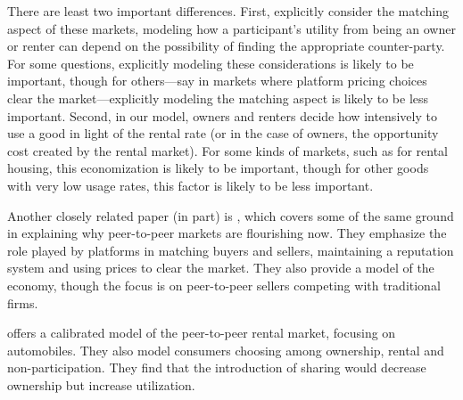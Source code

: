 \documentclass[11pt]{article}
\begin{document}
There are least two important differences.
First, \citeauthor{benjaafar2015peer} explicitly consider the matching aspect of these markets, modeling how a participant's utility from being an owner or renter can depend on the possibility of finding the appropriate counter-party.
For some questions, explicitly modeling these considerations is likely to be important, though for others---say in markets where platform pricing choices clear the market---explicitly modeling the matching aspect is likely to be less important. 
Second, in our model, owners and renters decide how intensively to use a good in light of the rental rate (or in the case of owners, the opportunity cost created by the rental market).
For some kinds of markets, such as for rental housing, this economization is likely to be important, though for other goods with very low usage rates, this factor is likely to be less important. 

Another closely related paper (in part) is \cite{einav2015peer}, which covers some of the same ground in explaining why peer-to-peer markets are flourishing now.
They emphasize the role played by platforms in matching buyers and sellers, maintaining a reputation system and using prices to clear the market.
They also provide a model of the economy, though the focus is on peer-to-peer sellers competing with traditional firms. 

\cite{frailberger2015} offers a calibrated model of the peer-to-peer rental market, focusing on automobiles.
They also model consumers choosing among ownership, rental and non-participation.
They find that the introduction of sharing would decrease ownership but increase utilization. 


% 

\end{document}
